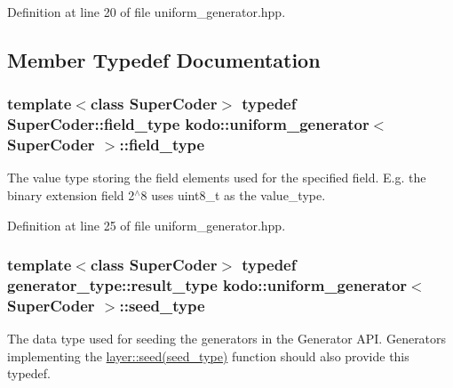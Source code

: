 Definition at line 20 of file uniform\-\_\-generator.\-hpp.



\subsection{Member Typedef Documentation}
\hypertarget{classkodo_1_1uniform__generator_a04203e599b984131091bc822a383a77d}{
\subsubsection[{field\-\_\-type}]{\setlength{\rightskip}{0pt plus 5cm}template$<$class Super\-Coder$>$ typedef Super\-Coder\-::field\-\_\-type {\bf kodo\-::uniform\-\_\-generator}$<$ Super\-Coder $>$\-::{\bf field\-\_\-type}}}\label{classkodo_1_1uniform__generator_a04203e599b984131091bc822a383a77d}




The value type storing the field elements used for the specified field. E.\-g. the binary extension field 2$^\wedge$8 uses uint8\-\_\-t as the value\-\_\-type. 

Definition at line 25 of file uniform\-\_\-generator.\-hpp.

\hypertarget{classkodo_1_1uniform__generator_a6db7150ba4f8c591c9cfbbb8e3b0e6b3}{
\subsubsection[{seed\-\_\-type}]{\setlength{\rightskip}{0pt plus 5cm}template$<$class Super\-Coder$>$ typedef generator\-\_\-type\-::result\-\_\-type {\bf kodo\-::uniform\-\_\-generator}$<$ Super\-Coder $>$\-::{\bf seed\-\_\-type}}}\label{classkodo_1_1uniform__generator_a6db7150ba4f8c591c9cfbbb8e3b0e6b3}




The data type used for seeding the generators in the Generator A\-P\-I. Generators implementing the \hyperlink{group__coefficient__generator__api_ga4afaaccc0d847e2c8ba021cc4e8c9672}{layer\-::seed(seed\-\_\-type)} function should also provide this typedef. 

